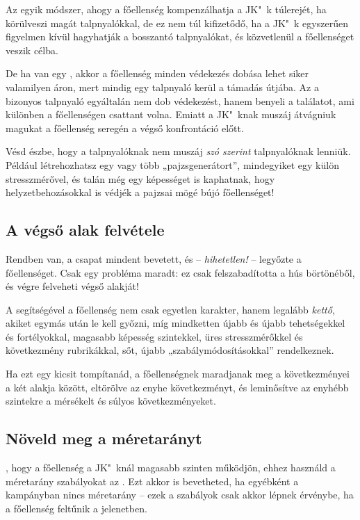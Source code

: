 Az egyik módszer, ahogy a főellenség kompenzálhatja a JK"~k túlerejét, ha körülveszi magát talpnyalókkal, de ez nem túl kifizetődő, ha a JK"~k egyszerűen figyelmen kívül hagyhatják a bosszantó talpnyalókat, és közvetlenül a főellenséget veszik célba.

De ha van egy , akkor a főellenség minden védekezés dobása lehet siker valamilyen áron, mert mindig egy talpnyaló kerül a támadás útjába. Az a bizonyos talpnyaló egyáltalán nem dob védekezést, hanem benyeli a találatot, ami különben a főellenségen csattant volna. Emiatt a JK"~knak muszáj átvágniuk magukat a főellenség seregén a végső konfrontáció előtt.

Vésd észbe, hogy a talpnyalóknak nem muszáj \emph{szó szerint} talpnyalóknak lenniük. Például létrehozhatsz egy vagy több „pajzsgenerátort”, mindegyiket egy külön stresszmérővel, és talán még egy képességet is kaphatnak, hogy helyzetbehozásokkal is védjék a pajzsai mögé bújó főellenséget!

\newpage

\subsection{A végső alak felvétele}

Rendben van, a csapat mindent bevetett, és -- \emph{hihetetlen!} -- legyőzte a főellenséget. Csak egy probléma maradt: ez csak felszabadította a hús börtönéből, és végre felveheti végső alakját!

A  segítségével a főellenség nem csak egyetlen karakter, hanem legalább \emph{kettő}, akiket egymás után le kell győzni, míg mindketten újabb és újabb tehetségekkel és fortélyokkal, magasabb képesség szintekkel, üres stresszmérőkkel és következmény rubrikákkal, sőt, újabb „szabálymódosításokkal” rendelkeznek.

Ha ezt egy kicsit tompítanád, a főellenségnek maradjanak meg a következményei a két alakja között, eltörölve az enyhe következményt, és leminősítve az enyhébb szintekre a mérsékelt és súlyos következményeket.

\subsection{Növeld meg a méretarányt}

, hogy a főellenség a JK"~knál magasabb szinten működjön, ehhez használd a méretarány szabályokat az . Ezt akkor is bevetheted, ha egyébként a kampányban nincs méretarány -- ezek a szabályok csak akkor lépnek érvénybe, ha a főellenség feltűnik a jelenetben.

